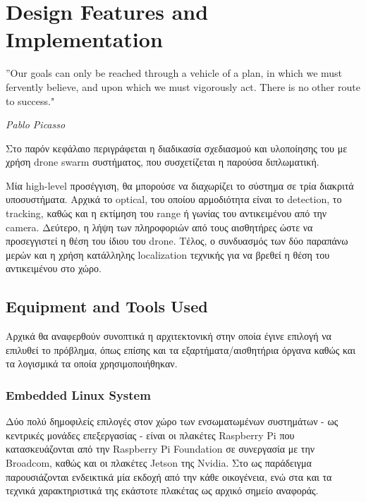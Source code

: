 \chapter{Design Features and Implementation} %
\label{chap:Chapter4}  %

\epigraph{”Our goals can only be reached through a vehicle of a plan, in which we must fervently believe, and upon which we must vigorously act. There is no other route to success." }{\textit{Pablo Picasso}}

Στο παρόν κεφάλαιο περιγράφεται η διαδικασία σχεδιασμού και υλοποίησης του  με χρήση drone swarm συστήματος, που συσχετίζεται η παρούσα διπλωματική. 

Μία high-level προσέγγιση, θα μπορούσε να διαχωρίζει το σύστημα σε τρία διακριτά
υποσυστήματα. Αρχικά το optical, του οποίου αρμοδιότητα είναι το detection, το tra\-cking, καθώς και η εκτίμηση
του range ή γωνίας του αντικειμένου από την camera. Δεύτερο, η λήψη των πληροφοριών από τους αισθητήρες ώστε να προσεγγιστεί η θέση του ίδιου
του drone. Τέλος, ο συνδυασμός των δύο παραπάνω μερών και η χρήση κατάλληλης localization τεχνικής για να βρεθεί η θέση του αντικειμένου
στο  χώρο.

\section{Equipment and Tools Used} \label{sec:design-tools}
Αρχικά θα αναφερθούν συνοπτικά η αρχιτεκτονική στην οποία έγινε επιλογή να επιλυθεί το πρόβλημα,
όπως επίσης και τα εξαρτήματα/αισθητήρια όργανα καθώς και τα λογισμικά τα οποία χρησιμοποιήθηκαν. 

\subsection{Embedded Linux System}
Δύο πολύ δημοφιλείς επιλογές στον χώρο των ενσωματωμένων συστημάτων - ως κεντρικές μονάδες επεξεργασίας - είναι οι πλακέτες Raspberry Pi που κατασκευάζονται από την Raspberry Pi Foundation σε συνεργασία με την Broadcom, καθώς και οι πλακέτες Jetson της Nvidia. Στο  ως παράδειγμα παρουσιάζονται ενδεικτικά μία εκδοχή από την κάθε οικογένεια, ενώ στα  και  τα τεχνικά χαρακτηριστικά της εκάστοτε πλακέτας ως αρχικό σημείο αναφοράς. 

